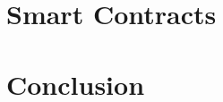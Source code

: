 \documentclass[12px, letterpaper]{article}
\begin{document}
\lipsum[1-3]

\section{Smart Contracts}

\lipsum[1-2]

\section{Conclusion}

\lipsum[1-2]
    
\begin{thebibliography}{}




\end{thebibliography}
\end{document}

